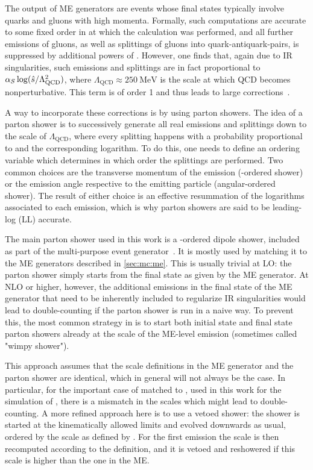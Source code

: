 The output of ME generators are events whose final states typically involve quarks and gluons with high momenta. Formally, such computations are accurate to some fixed order in \alphas at which the calculation was performed, and all further emissions of gluons, as well as splittings of gluons into quark-antiquark-pairs, is suppressed by additional powers of \alphas. However, one finds that, again due to IR singularities, such emissions and splittings are in fact proportional to $\alpha_S \log( \hat{s} / \Lambda_{\mathrm{QCD}}^2)$, where $\Lambda_{\mathrm{QCD}} \approx \SI{250}{\MeV}$ is the scale at which QCD becomes nonperturbative. This term is of order 1 and thus leads to large corrections~\cite{Peskin:1995ev}.

A way to incorporate these corrections is by using parton showers. The idea of a parton shower is to successively generate all real emissions and splittings down to the scale of $\Lambda_{\mathrm{QCD}}$, where every splitting happens with a probability proportional to \alphas and the corresponding logarithm. To do this, one needs to define an ordering variable which determines in which order the splittings are performed. Two common choices are the transverse momentum of the emission (\pt-ordered shower) or the emission angle respective to the emitting particle (angular-ordered shower). The result of either choice is an effective resummation of the logarithms associated to each emission, which is why parton showers are said to be leading-log (LL) accurate.

The main parton shower used in this work is a \pt-ordered dipole shower, included as part of the \pythia multi-purpose event generator~\cite{Pythia:2015,Pythia:2022}. It is mostly used by matching it to the ME generators described in \cref{sec:mc:me}. This is usually trivial at LO: the parton shower simply starts from the final state as given by the ME generator. At NLO or higher, however, the additional emissions in the final state of the ME generator that need to be inherently included to regularize IR singularities would lead to double-counting if the parton shower is run in a naive way. To prevent this, the most common strategy in \pythia is to start both initial state and final state parton showers already at the scale of the ME-level emission (sometimes called "wimpy shower").

This approach assumes that the scale definitions in the ME generator and the parton shower are identical, which in general will not always be the case. In particular, for the important case of \powheg matched to \pythia, used in this work for the simulation of \pptt, there is a mismatch in the scales which might lead to double-counting. A more refined approach here is to use a vetoed shower: the shower is started at the kinematically allowed limits and evolved downwards as usual, ordered by the scale as defined by \pythia. For the first emission the scale is then recomputed according to the \powheg definition, and it is vetoed and reshowered if this scale is higher than the one in the ME.

